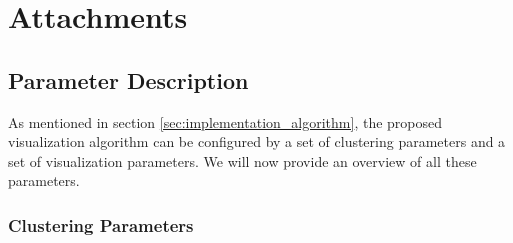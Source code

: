 \chapter{Attachments}

\section{Parameter Description}

As mentioned in section \ref{sec:implementation_algorithm}, the proposed visualization algorithm can be configured by a set of clustering parameters and a set of visualization parameters. We will now provide an overview of all these parameters.

\subsection{Clustering Parameters}

